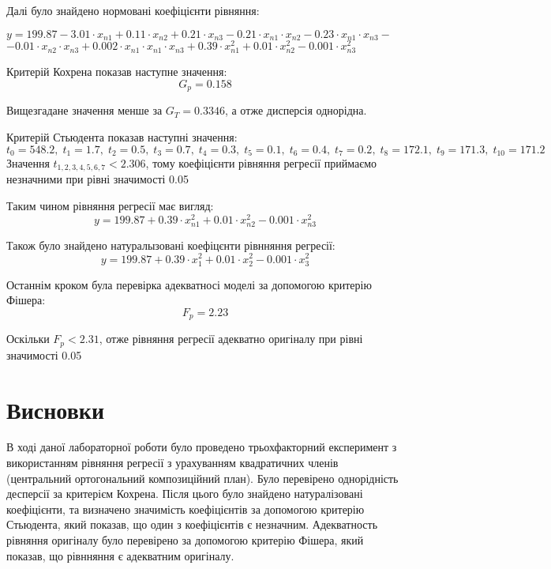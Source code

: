 \normalsize
Далі було знайдено нормовані коефіцієнти рівняння:
\begin{center}
    $y = 199.87-3.01\cdot x_{n1}+0.11\cdot x_{n2}+0.21\cdot x_{n3}-0.21\cdot x_{n1}\cdot x_{n2}-0.23\cdot x_{n1}\cdot x_{n3}-$
    $-0.01\cdot x_{n2}\cdot x_{n3}+0.002\cdot x_{n1}\cdot x_{n1}\cdot x_{n3}+0.39\cdot x^2_{n1}+0.01\cdot x^2_{n2}-0.001\cdot x^2_{n3}$        
\end{center}

Критерій Кохрена показав наступне значення:
\[G_p = 0.158\]

Вищезгадане значення менше за $G_T=0.3346$, а отже дисперсія однорідна.

Критерій Стьюдента показав наступні значення:
\small
\[t_0=548.2,\; t_1=1.7,\; t_2=0.5,\; t_3=0.7,\; t_4=0.3,\; t_5=0.1,\; t_6=0.4,\; t_7=0.2,\; t_8=172.1,\; t_9=171.3,\; t_{10}=171.2\]
\normalsize
Значення $t_{1,2,3,4,5,6,7}<2.306$, тому коефіцієнти рівняння регресії приймаємо
незначними при рівні значимості 0.05

Таким чином рівняння регресії має вигляд:
\[y = 199.87+0.39\cdot x^2_{n1}+0.01\cdot x^2_{n2}-0.001\cdot x^2_{n3}\]  

Також було знайдено натуралызовані коефіцєнти рівнняння регресії:
\[y = 199.87+0.39\cdot x^2_{1}+0.01\cdot x^2_{2}-0.001\cdot x^2_{3}\]  

Останнім кроком була перевірка адекватносі моделі за допомогою критерію Фішера:
\[F_p = 2.23\]

Оскільки $F_p<2.31$, отже рівняння регресії адекватно оригіналу при рівні 
значимості 0.05

\section{Висновки}
В ході даної лабораторної роботи було проведено трьохфакторний експеримент з 
використанням рівняння регресії з урахуванням квадратичних членів
(центральний ортогональний композиційний план). Було перевірено однорідність десперсії
за критерієм Кохрена. Після цього було знайдено натуралізовані коефіцієнти, та визначено
значимість коефіцієнтів за допомогою критерію Стьюдента, який показав, що один з 
коефіцієнтів є незначним. Адекватность рівняння оригіналу було перевірено за допомогою
критерію Фішера, який показав, що рівнняння є адекватним оригіналу.